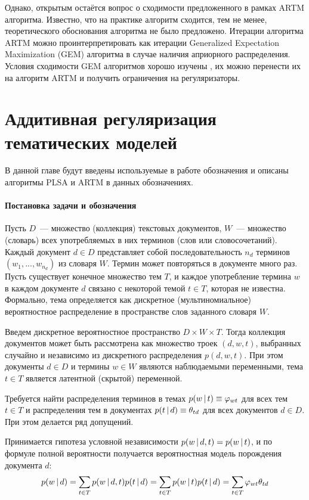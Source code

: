 \documentclass[12pt, twoside]{article}
\begin{document}
Однако, открытым остаётся вопрос о сходимости предложенного в рамках ARTM алгоритма. Известно, что на практике алгоритм сходится, тем не менее, теоретического обоснования алгоритма не было предложено. Итерации алгоритма ARTM можно проинтерпретировать как итерации Generalized Expectation Maximization (GEM) алгоритма \cite{dempster1977maximum} в случае наличия априорного распределения. Условия сходимости GEM алгоритмов хорошо изучены \cite{wu1983convergence}, их можно перенести их на алгоритм ARTM и получить ограничения на регуляризаторы.


\section{Аддитивная регуляризация тематических моделей}
В данной главе будут введены используемые в работе обозначения и описаны алгоритмы PLSA и ARTM в данных обозначениях.
\paragraph{Постановка задачи и обозначения}
\label{subsec:denotes}
Пусть $D$~--- множество (коллекция) текстовых документов, $W$~--- множество (словарь) всех употребляемых в них терминов (слов или словосочетаний). Каждый документ $d \in D$ представляет собой последовательность $n_d$ терминов $(w_1, . . . , w_{n_d})$ из словаря $W$. Термин может повторяться в документе много раз. Пусть существует конечное множество тем $T$, и каждое употребление термина $w$ в каждом документе $d$ связано с некоторой темой $t \in T$, которая не известна. Формально, тема определяется как дискретное (мультиномиальное) вероятностное распределение в пространстве слов заданного словаря $W$.

Введем дискретное вероятностное пространство $D \times W \times T$. Тогда коллекция документов может быть рассмотрена как множество троек $(d, w, t)$, выбранных случайно и независимо из дискретного распределения $p(d, w, t)$. При этом документы $d \in D$ и термины $w \in W$ являются наблюдаемыми переменными, тема $t \in T$ является латентной (скрытой) переменной.

Требуется найти распределения терминов в темах $p(w \mspace{3mu}{|}\mspace{3mu} t) \equiv \varphi_{wt}$ для всех тем $t \in T$ и распределения тем в документах $p(t \mspace{3mu}{|}\mspace{3mu} d) \equiv \theta_{td}$ для всех документов $d \in D$. При этом делается ряд допущений.

Принимается гипотеза условной независимости $p(w \mspace{3mu}{|}\mspace{3mu} d,t) = p(w \mspace{3mu}{|}\mspace{3mu} t)$, и  по формуле полной вероятности получается вероятностная модель порождения документа $d$:
\[
p(w \mspace{3mu}{|}\mspace{3mu} d) = \sum_{t \in T} p(w \mspace{3mu}{|}\mspace{3mu} d,t)p(t \mspace{3mu}{|}\mspace{3mu} d) = \sum_{t \in T}p(w \mspace{3mu}{|}\mspace{3mu} t)p(t \mspace{3mu}{|}\mspace{3mu} d)=\sum_{t \in T}\varphi_{wt}\theta_{td}
\]
\end{document}

